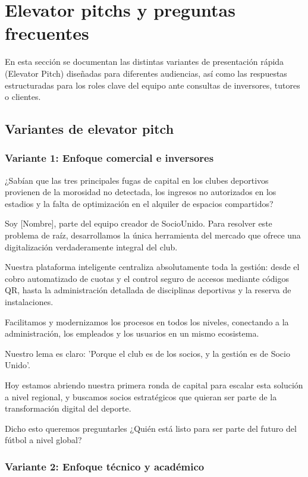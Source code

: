 \section{Elevator pitchs y preguntas frecuentes}

En esta sección se documentan las distintas variantes de presentación rápida (Elevator Pitch) diseñadas para diferentes audiencias, así como las respuestas estructuradas para los roles clave del equipo ante consultas de inversores, tutores o clientes.

\subsection{Variantes de elevator pitch}

\subsubsection{Variante 1: Enfoque comercial e inversores}

¿Sabían que las tres principales fugas de capital en los clubes deportivos provienen de la morosidad no detectada, los ingresos no autorizados en los estadios y la falta de optimización en el alquiler de espacios compartidos?

Soy [Nombre], parte del equipo creador de SocioUnido. Para resolver este problema de raíz, desarrollamos la única herramienta del mercado que ofrece una digitalización verdaderamente integral del club.

Nuestra plataforma inteligente centraliza absolutamente toda la gestión: desde el cobro automatizado de cuotas y el control seguro de accesos mediante códigos QR, hasta la administración detallada de disciplinas deportivas y la reserva de instalaciones.

Facilitamos y modernizamos los procesos en todos los niveles, conectando a la administración, los empleados y los usuarios en un mismo ecosistema.

Nuestro lema es claro: 'Porque el club es de los socios, y la gestión es de Socio Unido'.

Hoy estamos abriendo nuestra primera ronda de capital para escalar esta solución a nivel regional, y buscamos socios estratégicos que quieran ser parte de la transformación digital del deporte.

Dicho esto queremos preguntarles ¿Quién está listo para ser parte del futuro del fútbol a nivel global?

\subsubsection{Variante 2: Enfoque técnico y académico}

